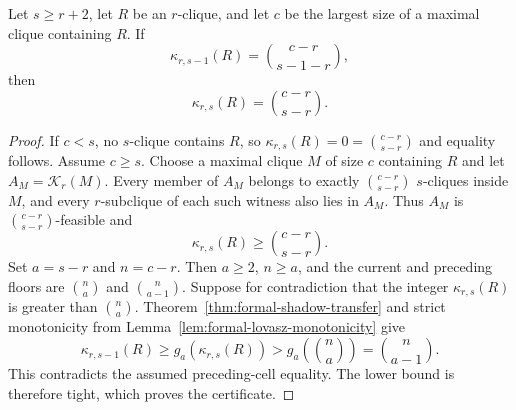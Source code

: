 \begin{theorem}
\label{thm:formal-chain-certificate}
Let $s\geq r+2$, let $R$ be an $r$-clique, and let $c$ be the largest size of a maximal clique containing $R$.
%
If
\[
\kappa_{r,s-1}(R)=\binom{c-r}{s-1-r},
\]
then
\[
\kappa_{r,s}(R)=\binom{c-r}{s-r}.
\]
\end{theorem}
\begin{proof}
If $c<s$, no $s$-clique contains $R$, so $\kappa_{r,s}(R)=0=\binom{c-r}{s-r}$ and equality follows.
%
Assume $c\geq s$.
%
Choose a maximal clique $M$ of size $c$ containing $R$ and let $A_M=\mathcal K_r(M)$.
%
Every member of $A_M$ belongs to exactly $\binom{c-r}{s-r}$ $s$-cliques inside $M$, and every $r$-subclique of each such witness also lies in $A_M$.
%
Thus $A_M$ is $\binom{c-r}{s-r}$-feasible and
\[
\kappa_{r,s}(R)\geq\binom{c-r}{s-r}.
\]
Set $a=s-r$ and $n=c-r$.
%
Then $a\geq2$, $n\geq a$, and the current and preceding floors are $\binom na$ and $\binom n{a-1}$.
%
Suppose for contradiction that the integer $\kappa_{r,s}(R)$ is greater than $\binom na$.
%
Theorem~\ref{thm:formal-shadow-transfer} and strict monotonicity from Lemma~\ref{lem:formal-lovasz-monotonicity} give
\[
\kappa_{r,s-1}(R)
\geq g_a(\kappa_{r,s}(R))
>g_a\!\left(\binom na\right)
=\binom n{a-1}.
\]
This contradicts the assumed preceding-cell equality.
%
The lower bound is therefore tight, which proves the certificate.
\end{proof}

